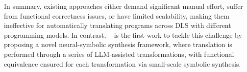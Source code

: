 In summary, existing approaches either demand significant manual effort, suffer from functional correctness issues, or have limited scalability, making them ineffective for automatically translating programs across DLS with different programming models.
In contrast, ~\name{} is the first work to tackle this challenge by proposing a novel neural-symbolic synthesis framework, where translation is performed through a series of LLM-assisted transformations, with functional equivalence ensured for each transformation via small-scale symbolic synthesis.

